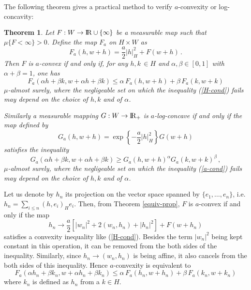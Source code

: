\documentclass[12pt,a4paper]{book}
\newtheorem{theorem}{Theorem}[section]
\newcommand{\reals}{{\rm I\!R}}
\newcommand{\proof}{\noindent {\bf Proof:\ }}
\begin{document}
\noindent
The following theorem gives  a practical method to verify
$a$-convexity or log-concavity:
\begin{theorem}
\label{a-con-thm}
Let $F:W\to \reals\cup\{\infty\}$ be a measurable map such that
$\mu\{F<\infty\}>0$. Define the map $F_a$ on $H\times W$ as
$$
F_a(h,w+h)=\frac{a}{2}|h|_H^2+F(w+h)\,.
$$
Then $F$ is $a$-convex if and only if, for any $h,k\,\in H$ and
$\alpha,\beta\in[0,1]$ with $\alpha+\beta=1$, one has
\begin{equation}
\label{H-cond}
F_a(\alpha h+\beta k,w+\alpha h+\beta k)\leq \alpha\, F_a(h,w+h)+\beta\,
F_a(k,w+k)
\end{equation}
$\mu$-almost surely, where the negligeable set on which the inequality
(\ref{H-cond}) fails may depend on the choice of $h,k$ and of
$\alpha$.

Similarly a measurable mapping $G:W\to \reals_+$ is
$a$-log-concave if and only if the map defined by
$$
G_a(h,w+h)=\exp\left\{-\frac{a}{2}|h|_H^2\right\}G(w+h)
$$
satisfies the inequality
\begin{equation}
\label{a-cond}
G_a(\alpha h+\beta k,w+\alpha h+\beta k)\geq G_a( h,w+h)^\alpha
G_a( k,w+k)^\beta\,,
\end{equation}
$\mu$-almost surely, where the negligeable set on which the inequality
(\ref{a-cond}) fails may depend on the choice of $h,k$ and of
$\alpha$.
\end{theorem}
\proof
Let us denote by $h_n$ its projection on
the vector space spanned by $\{e_1,\ldots,e_n\}$, i.e.  $h_n=\sum_{i\leq
  n}(h,e_i)_H e_i$. Then, from Theorem \ref{equiv-prop}, $F$ is
$a$-convex if and only if the map
$$
h_n\rightarrow
\frac{a}{2}\left[|w_n|^2+2(w_n,h_n)+|h_n|^2\right]+F(w+h_n)
$$
satisfies a convexity inequality like (\ref{H-cond}). Besides the
term $|w_n|^2$ being kept constant in this operation,   it can be
removed from the both sides of the inequality. Similarly, since
$h_n\to (w_n,h_n)$ is being affine, it also cancels from the both
sides of this inequality. Hence $a$-convexity is equivalent to
$$
F_a(\alpha h_n+\beta k_n,w+\alpha h_n+\beta k_n)\leq
 \alpha\, F_a(h_n,w+h_n)+\beta\,F_a(k_n,w+k_n)
$$
where $k_n$ is defined as $h_n$ from a $k\in H$.
\end{document}
